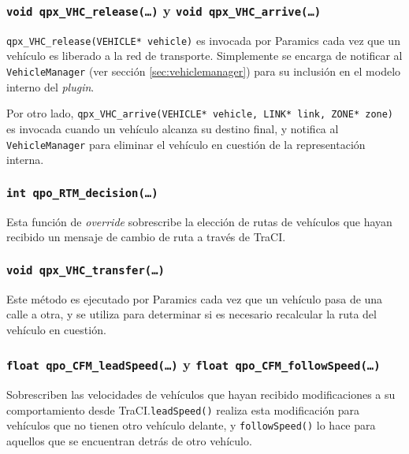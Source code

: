 \subsubsection{\texttt{void qpx\_VHC\_release(\dots)} y \texttt{void qpx\_VHC\_arrive(\dots)}}

\texttt{qpx\_VHC\_release(VEHICLE* vehicle)} es invocada por Paramics cada vez que un vehículo es liberado a la red de transporte. Simplemente se encarga de notificar al \texttt{VehicleManager} (ver sección \ref{sec:vehiclemanager}) para su inclusión en el modelo interno del \emph{plugin}.

Por otro lado, \texttt{qpx\_VHC\_arrive(VEHICLE* vehicle, LINK* link, ZONE* zone)} es invocada cuando un vehículo alcanza su destino final, y notifica al \texttt{VehicleManager} para eliminar el vehículo en cuestión de la representación interna.

\subsubsection{\texttt{int qpo\_RTM\_decision(\dots)}}

Esta función de \emph{override} sobrescribe la elección de rutas de vehículos que hayan recibido un mensaje de cambio de ruta a través de TraCI.

\subsubsection{\texttt{void qpx\_VHC\_transfer(\dots)}}

Este método es ejecutado por Paramics cada vez que un vehículo pasa de una calle a otra, y se utiliza para determinar si es necesario recalcular la ruta del vehículo en cuestión.

\subsubsection{\texttt{float qpo\_CFM\_leadSpeed(\dots)} y \texttt{float qpo\_CFM\_followSpeed(\dots)}}

Sobrescriben las velocidades de vehículos que hayan recibido modificaciones a su comportamiento desde TraCI.\texttt{leadSpeed()} realiza esta modificación para vehículos que no tienen otro vehículo delante, y \texttt{followSpeed()} lo hace para aquellos que se encuentran detrás de otro vehículo.